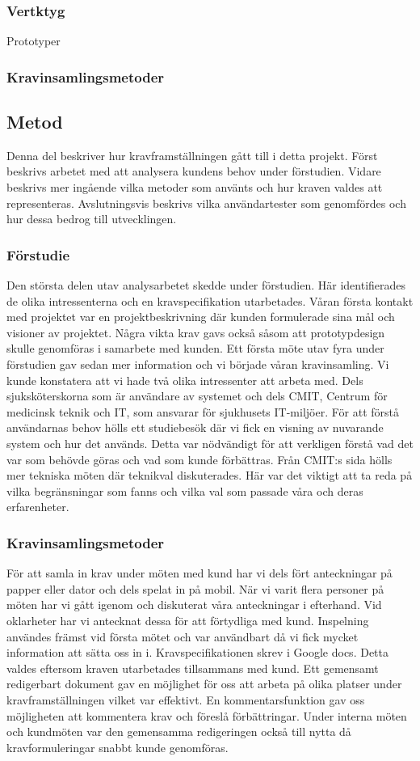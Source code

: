 \subsubsection{Vertktyg}
Prototyper
\subsubsection{Kravinsamlingsmetoder}
\subsection{Metod}
Denna del beskriver hur kravframställningen gått till i detta projekt. Först beskrivs arbetet med att analysera kundens behov under förstudien. Vidare beskrivs mer ingående vilka metoder som använts och hur kraven valdes att representeras. Avslutningsvis beskrivs vilka användartester som genomfördes och hur dessa bedrog till utvecklingen.
\subsubsection{Förstudie}
Den största delen utav analysarbetet skedde under förstudien. Här identifierades de olika intressenterna och en kravspecifikation utarbetades. Våran första kontakt med projektet var en projektbeskrivning där kunden formulerade sina mål och visioner av projektet. Några vikta krav gavs också såsom att prototypdesign skulle genomföras i samarbete med kunden. Ett första möte utav fyra under förstudien gav sedan mer information och vi började våran kravinsamling. Vi kunde konstatera att vi hade två olika intressenter att arbeta med. Dels sjuksköterskorna som är användare av systemet och dels CMIT, Centrum för medicinsk teknik och IT, som ansvarar för sjukhusets IT-miljöer. För att förstå användarnas behov hölls ett studiebesök där vi fick en visning av nuvarande system och hur det används. Detta var nödvändigt för att verkligen förstå vad det var som behövde göras och vad som kunde förbättras. Från CMIT:s sida hölls mer tekniska möten där teknikval diskuterades. Här var det viktigt att ta reda på vilka begränsningar som fanns och vilka val som passade våra och deras erfarenheter.
\subsubsection{Kravinsamlingsmetoder}
För att samla in krav under möten med kund har vi dels fört anteckningar på papper eller dator och dels spelat in på mobil. När vi varit flera personer på möten har vi gått igenom och diskuterat våra anteckningar i efterhand. Vid oklarheter har vi antecknat dessa för att förtydliga med kund. Inspelning användes främst vid första mötet och var användbart då vi fick mycket information att sätta oss in i.
Kravspecifikationen skrev i Google docs. Detta valdes eftersom kraven utarbetades tillsammans med kund. Ett gemensamt redigerbart dokument gav en möjlighet för oss att arbeta på olika platser under kravframställningen vilket var effektivt. En kommentarsfunktion gav oss möjligheten att kommentera krav och föreslå förbättringar. Under interna möten och kundmöten var den gemensamma redigeringen också till nytta då kravformuleringar snabbt kunde genomföras.
